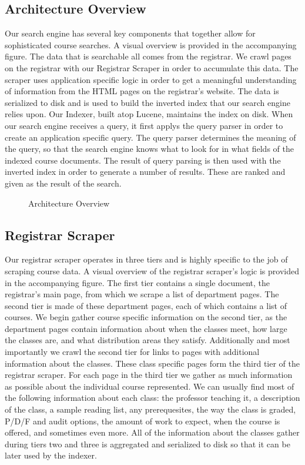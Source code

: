 \documentclass[12pt,letterpaper]{article}
\begin{document}
\subsection{Architecture Overview}
Our search engine has several key components that together allow for sophisticated course searches. A visual overview is provided in the accompanying figure. The data that is searchable all comes from the registrar. We crawl pages on the registrar with our Registrar Scraper in order to accumulate this data. The scraper uses application specific logic in order to get a meaningful understanding of information from the HTML pages on the registrar's website. The data is serialized to disk and is used to build the inverted index that our search engine relies upon. Our Indexer, built atop Lucene, maintains the index on disk. When our search engine receives a query, it first applys the query parser in order to create an application specific query. The query parser determines the meaning of the query, so that the search engine knows what to look for in what fields of the indexed course documents. The result of query parsing is then used with the inverted index in order to generate a number of results. These are ranked and given as the result of the search.

\begin{figure}
\caption{Architecture Overview}

\end{figure}

\subsection{Registrar Scraper}

Our registrar scraper operates in three tiers and is highly specific to the job of scraping course data. A visual overview of the registrar scraper's logic is provided in the accompanying figure. The first tier contains a single document, the registrar's main page, from which we scrape a list of department pages. The second tier is made of these department pages, each of which contains a list of courses. We begin gather course specific information on the second tier, as the department pages contain information about when the classes meet, how large the classes are, and what distribution areas they satisfy. Additionally and most importantly we crawl the second tier for links to pages with additional information about the classes. These class specific pages form the third tier of the registrar scraper. For each page in the third tier we gather as much information as possible about the individual course represented. We can usually find most of the following information about each class: the professor teaching it, a description of the class, a sample reading list, any prerequesites, the way the class is graded, P/D/F and audit options, the amount of work to expect, when the course is offered, and sometimes even more. All of the information about the classes gather during tiers two and three is aggregated and serialized to disk so that it can be later used by the indexer.
\end{document}
